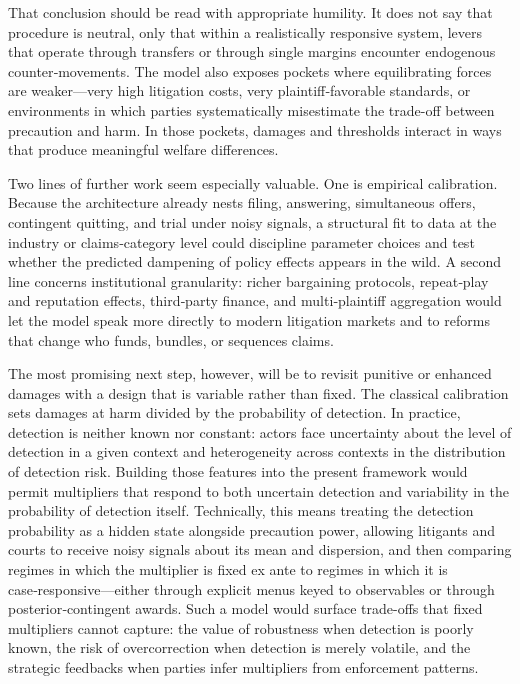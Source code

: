 \documentclass{article}
\begin{document}
That conclusion should be read with appropriate humility. It does not say that procedure is neutral, only that within a realistically responsive system, levers that operate through transfers or through single margins encounter endogenous counter‑movements. The model also exposes pockets where equilibrating forces are weaker—very high litigation costs, very plaintiff‑favorable standards, or environments in which parties systematically misestimate the trade-off between precaution and harm. In those pockets, damages and thresholds interact in ways that produce meaningful welfare differences.

Two lines of further work seem especially valuable. One is empirical calibration. Because the architecture already nests filing, answering, simultaneous offers, contingent quitting, and trial under noisy signals, a structural fit to data at the industry or claims‑category level could discipline parameter choices and test whether the predicted dampening of policy effects appears in the wild. A second line concerns institutional granularity: richer bargaining protocols, repeat‑play and reputation effects, third‑party finance, and multi‑plaintiff aggregation would let the model speak more directly to modern litigation markets and to reforms that change who funds, bundles, or sequences claims.

The most promising next step, however, will be to revisit punitive or enhanced damages with a design that is variable rather than fixed. The classical calibration sets damages at harm divided by the probability of detection. In practice, detection is neither known nor constant: actors face uncertainty about the level of detection in a given context and heterogeneity across contexts in the distribution of detection risk. Building those features into the present framework would permit multipliers that respond to both uncertain detection and variability in the probability of detection itself. Technically, this means treating the detection probability as a hidden state alongside precaution power, allowing litigants and courts to receive noisy signals about its mean and dispersion, and then comparing regimes in which the multiplier is fixed ex ante to regimes in which it is case‑responsive—either through explicit menus keyed to observables or through posterior‑contingent awards. Such a model would surface trade-offs that fixed multipliers cannot capture: the value of robustness when detection is poorly known, the risk of overcorrection when detection is merely volatile, and the strategic feedbacks when parties infer multipliers from enforcement patterns.
\end{document}
